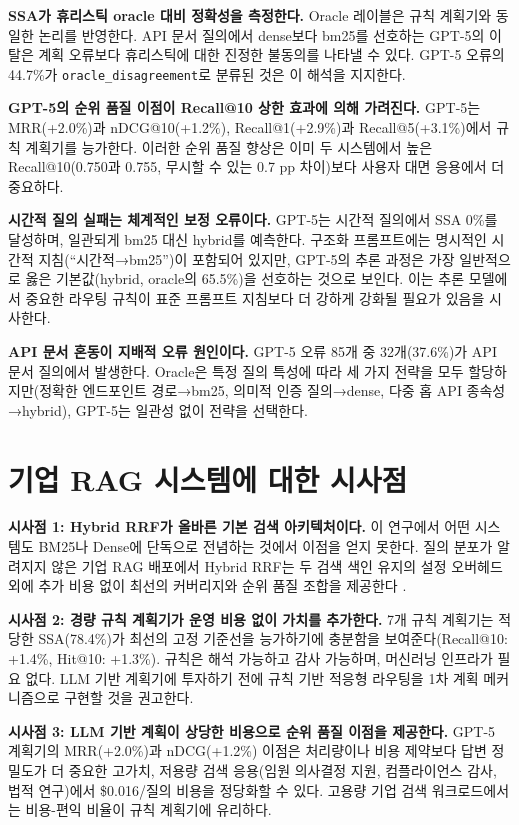 \textbf{SSA가 휴리스틱 oracle 대비 정확성을 측정한다.} Oracle 레이블은 규칙 계획기와 동일한 논리를 반영한다. API 문서 질의에서 dense보다 bm25를 선호하는 GPT-5의 이탈은 계획 오류보다 휴리스틱에 대한 진정한 불동의를 나타낼 수 있다. GPT-5 오류의 44.7\%가 \texttt{oracle\_disagreement}로 분류된 것은 이 해석을 지지한다.

\textbf{GPT-5의 순위 품질 이점이 Recall@10 상한 효과에 의해 가려진다.} GPT-5는 MRR(+2.0\%)과 nDCG@10(+1.2\%), Recall@1(+2.9\%)과 Recall@5(+3.1\%)에서 규칙 계획기를 능가한다. 이러한 순위 품질 향상은 이미 두 시스템에서 높은 Recall@10(0.750과 0.755, 무시할 수 있는 0.7 pp 차이)보다 사용자 대면 응용에서 더 중요하다.

\textbf{시간적 질의 실패는 체계적인 보정 오류이다.} GPT-5는 시간적 질의에서 SSA 0\%를 달성하며, 일관되게 bm25 대신 hybrid를 예측한다. 구조화 프롬프트에는 명시적인 시간적 지침(``시간적→bm25'')이 포함되어 있지만, GPT-5의 추론 과정은 가장 일반적으로 옳은 기본값(hybrid, oracle의 65.5\%)을 선호하는 것으로 보인다. 이는 추론 모델에서 중요한 라우팅 규칙이 표준 프롬프트 지침보다 더 강하게 강화될 필요가 있음을 시사한다.

\textbf{API 문서 혼동이 지배적 오류 원인이다.} GPT-5 오류 85개 중 32개(37.6\%)가 API 문서 질의에서 발생한다. Oracle은 특정 질의 특성에 따라 세 가지 전략을 모두 할당하지만(정확한 엔드포인트 경로→bm25, 의미적 인증 질의→dense, 다중 홉 API 종속성→hybrid), GPT-5는 일관성 없이 전략을 선택한다.

\section{기업 RAG 시스템에 대한 시사점}
\label{sec:disc_implications_ko}

\textbf{시사점 1: Hybrid RRF가 올바른 기본 검색 아키텍처이다.} 이 연구에서 어떤 시스템도 BM25나 Dense에 단독으로 전념하는 것에서 이점을 얻지 못한다. 질의 분포가 알려지지 않은 기업 RAG 배포에서 Hybrid RRF는 두 검색 색인 유지의 설정 오버헤드 외에 추가 비용 없이 최선의 커버리지와 순위 품질 조합을 제공한다 \citep{luan2021sparse_dense}.

\textbf{시사점 2: 경량 규칙 계획기가 운영 비용 없이 가치를 추가한다.} 7개 규칙 계획기는 적당한 SSA(78.4\%)가 최선의 고정 기준선을 능가하기에 충분함을 보여준다(Recall@10: +1.4\%, Hit@10: +1.3\%). 규칙은 해석 가능하고 감사 가능하며, 머신러닝 인프라가 필요 없다. LLM 기반 계획기에 투자하기 전에 규칙 기반 적응형 라우팅을 1차 계획 메커니즘으로 구현할 것을 권고한다.

\textbf{시사점 3: LLM 기반 계획이 상당한 비용으로 순위 품질 이점을 제공한다.} GPT-5 계획기의 MRR(+2.0\%)과 nDCG(+1.2\%) 이점은 처리량이나 비용 제약보다 답변 정밀도가 더 중요한 고가치, 저용량 검색 응용(임원 의사결정 지원, 컴플라이언스 감사, 법적 연구)에서 \$0.016/질의 비용을 정당화할 수 있다. 고용량 기업 검색 워크로드에서는 비용-편익 비율이 규칙 계획기에 유리하다.

